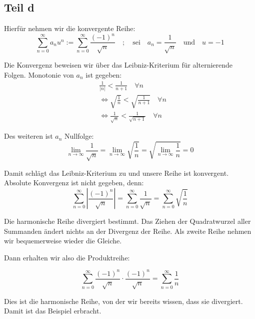 \documentclass[a4paper,german,12pt,smallheadings]{scrartcl}
\begin{document}
\subsection*{Teil d}

Hierfür nehmen wir die konvergente Reihe:
\begin{equation*}
\sum\limits_{n=0}^{\infty} a_nu^n:=\sum\limits_{n=0}^{\infty} \frac{(-1)^n}{\sqrt{n}} \quad ; \quad \text{sei} \quad a_n=\frac{1}{\sqrt{n}} \quad \text{und} \quad u=-1
\end{equation*}

Die Konvergenz beweisen wir über das Leibniz-Kriterium für alternierende Folgen. Monotonie von $a_n$ ist gegeben:
\begin{align*}
  & \frac{1}{|n|}<\frac{1}{n+1} \quad \forall n\\
  & \Leftrightarrow \sqrt{\frac{1}{n}}<\sqrt{\frac{1}{n+1}} \quad \forall n\\
  & \Leftrightarrow \frac{1}{\sqrt{n}}< \frac{1}{\sqrt{n+1}} \quad \forall n
\end{align*}

Des weiteren ist $a_n$ Nullfolge:
\begin{equation}
\lim\limits_{n \to \infty} \frac{1}{\sqrt{n}}=\lim\limits_{n \to \infty} \sqrt{\frac{1}{n}}=\sqrt{\lim\limits_{n \to \infty} \frac{1}{n}}=0
\end{equation}

Damit schlägt das Leibniz-Kriterium zu und unsere Reihe ist konvergent. Absolute Konvergenz ist nicht gegeben, denn:
\begin{equation*}
\sum\limits_{n=0}^{\infty} \left|\frac{(-1)^n}{\sqrt{n}}\right| = \sum\limits_{n=0}^{\infty} \frac{1}{\sqrt{n}}=\sum\limits_{n=0}^{\infty} \sqrt{\frac{1}{n}}
\end{equation*}

Die harmonische Reihe divergiert bestimmt. Das Ziehen der Quadratwurzel aller
Summanden ändert nichts an der Divergenz der Reihe.  Als zweite Reihe nehmen
wir bequemerweise wieder die Gleiche.

Dann erhalten wir also die Produktreihe:

\begin{equation*}
  \sum\limits_{n=0}^{\infty} \frac{(-1)^n}{\sqrt{n}} \cdot \frac{(-1)^n}{\sqrt{n}}=\sum\limits_{n=0}^{\infty} \frac{1}{n}
\end{equation*}

Dies ist die harmonische Reihe, von der wir bereits wissen, dass sie divergiert. Damit ist das Beispiel erbracht.
\end{document}
